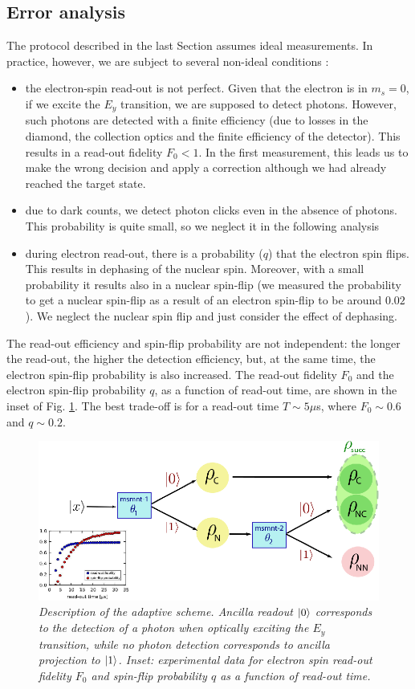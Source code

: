 \subsection{Error analysis}
The protocol described in the last Section assumes ideal measurements. In practice, however, we are subject to several non-ideal conditions \cite{Robledo_Nature_2011}:
\begin{itemize}
 \item the electron-spin read-out is not perfect. Given that the electron is in $m_s=0$, if we excite the $E_{y}$ transition, we are supposed to detect photons. However, such photons are detected with a finite efficiency (due to losses in the diamond, the collection optics and the finite efficiency of the detector). This results in a read-out fidelity $F_0 < 1$. In the first measurement, this leads us to make the wrong decision and apply a correction although we had already reached the target state.
 \item due to dark counts, we detect photon clicks even in the absence of photons. This probability is quite small, so we neglect it in the following analysis
 \item during electron read-out, there is a probability ($q$) that the electron spin flips. This results in dephasing of the nuclear spin. Moreover, with a small probability it results also in a nuclear spin-flip (we measured the probability to get a nuclear spin-flip as a result of an electron spin-flip to be around $0.02$). We neglect the nuclear spin flip and just consider the effect of dephasing.
\end{itemize}

The read-out efficiency and spin-flip probability are not independent: the longer the read-out, the higher the detection efficiency, but, at the same time, the electron spin-flip probability is also increased. The read-out fidelity $F_0$ and the electron spin-flip probability $q$, as a function of read-out time, are shown in the inset of Fig. \ref{fig:adaptiveScheme}. The best trade-off is for a read-out time $T \sim 5 \mu$s, where $F_0 \sim 0.6$ and $q \sim 0.2$.

\begin{figure} 
\includegraphics [width = 12 cm]{SOM/fig10_adaptiveScheme.eps}
\caption{\textit{Description of the adaptive scheme. Ancilla readout $\left|0\right>$ corresponds to the detection of a photon when optically exciting the $E_{y}$ transition, while no photon detection corresponds to ancilla projection to $\left|1\right>$. Inset: experimental data for electron spin read-out fidelity $F_0$ and spin-flip probability $q$ as a function of read-out time.}}
\label{fig:adaptiveScheme}
\end{figure} 

\newpage




